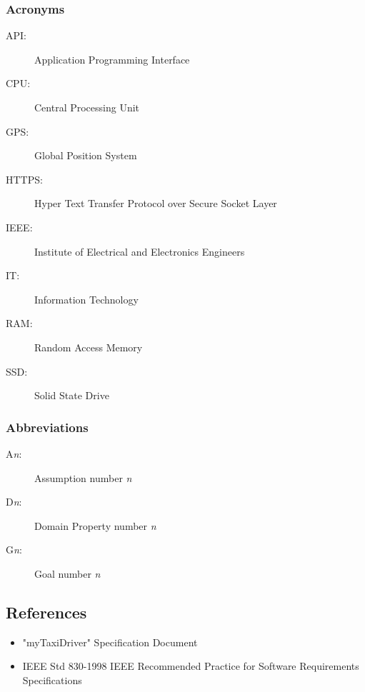 \documentclass[a4paper]{article}
\begin{document}
\subsubsection{Acronyms}
\begin{description}
\item[API:] Application Programming Interface
\item[CPU:] Central Processing Unit
\item[GPS:] Global Position System
\item[HTTPS:] Hyper Text Transfer Protocol over Secure Socket Layer
\item[IEEE:] Institute of Electrical and Electronics Engineers
\item[IT:] Information Technology
\item[RAM:] Random Access Memory
\item[SSD:] Solid State Drive 
\end{description}

\subsubsection{Abbreviations}
\begin{description}
\item[A\emph{n}:] Assumption number \emph{n}
\item[D\emph{n}:] Domain Property number \emph{n}
\item[G\emph{n}:] Goal number \emph{n}
\item[]
\end{description}

\subsection{References}
\begin{itemize}
\item "myTaxiDriver" Specification Document
\item IEEE Std 830-1998 IEEE Recommended Practice for Software Requirements Specifications
\end{itemize}
\end{document}
